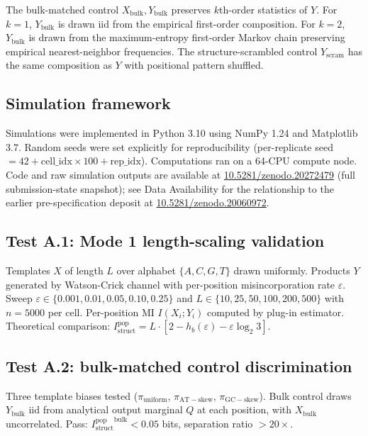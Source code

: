 \documentclass[aps,prx,reprint,amsmath,amssymb,floatfix,superscriptaddress,nofootinbib]{revtex4-2}
\newcommand{\zenodoDOI}{\href{https://doi.org/10.5281/zenodo.20060972}{10.5281/zenodo.20060972}}
\newcommand{\zenodoSubmissionDOI}{\href{https://doi.org/10.5281/zenodo.20272479}{10.5281/zenodo.20272479}}
\theoremstyle{plain-thm}
\theoremstyle{definition-thm}
\newcommand{\Istructpop}{I_{\mathrm{struct}}^{\mathrm{pop}}}
\newcommand{\Hbin}{h_b}
\begin{document}
The bulk-matched control $X_{\mathrm{bulk}}, Y_{\mathrm{bulk}}$ preserves $k$th-order statistics of $Y$. For $k = 1$, $Y_{\mathrm{bulk}}$ is drawn iid from the empirical first-order composition. For $k = 2$, $Y_{\mathrm{bulk}}$ is drawn from the maximum-entropy first-order Markov chain preserving empirical nearest-neighbor frequencies. The structure-scrambled control $Y_{\mathrm{scram}}$ has the same composition as $Y$ with positional pattern shuffled.

\subsection{Simulation framework}

Simulations were implemented in Python 3.10 using NumPy 1.24 and Matplotlib 3.7. Random seeds were set explicitly for reproducibility (per-replicate seed $= 42 + \mathrm{cell\_idx} \times 100 + \mathrm{rep\_idx}$). Computations ran on a 64-CPU compute node. Code and raw simulation outputs are available at \zenodoSubmissionDOI{} (full submission-state snapshot); see Data Availability for the relationship to the earlier pre-specification deposit at \zenodoDOI{}.

\subsection{Test A.1: Mode 1 length-scaling validation}

Templates $X$ of length $L$ over alphabet $\{A, C, G, T\}$ drawn uniformly. Products $Y$ generated by Watson-Crick channel with per-position misincorporation rate $\varepsilon$. Sweep $\varepsilon \in \{0.001, 0.01, 0.05, 0.10, 0.25\}$ and $L \in \{10, 25, 50, 100, 200, 500\}$ with $n = 5000$ per cell. Per-position MI $I(X_i; Y_i)$ computed by plug-in estimator. Theoretical comparison: $\Istructpop = L \cdot \left[2 - \Hbin(\varepsilon) - \varepsilon \log_2 3\right]$.

\subsection{Test A.2: bulk-matched control discrimination}

Three template biases tested ($\pi_{\mathrm{uniform}}$, $\pi_{\mathrm{AT-skew}}$, $\pi_{\mathrm{GC-skew}}$). Bulk control draws $Y_{\mathrm{bulk}}$ iid from analytical output marginal $Q$ at each position, with $X_{\mathrm{bulk}}$ uncorrelated. Pass: ${\Istructpop}^{\mathrm{bulk}} < 0.05$ bits, separation ratio $> 20\times$.
\end{document}
